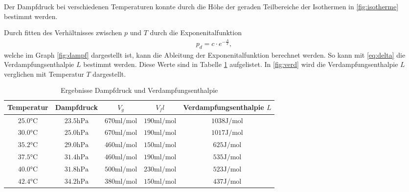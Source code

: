 \documentclass[11pt, a4paper]{article}
\begin{document}
    Der Dampfdruck bei verschiedenen Temperaturen konnte durch die Höhe der geraden Teilbereiche
    der Isothermen in \ref{fig:isotherme} bestimmt werden.
    

    Durch fitten des Verhältnisses zwischen $p$ und $T$ durch die Exponenitalfunktion
    \begin{align}
        p_d = c \cdot e^{-\frac{A}{T}},
    \end{align}
    welche im Graph \ref{fig:dampf} dargestellt ist,
    kann die Ableitung der Exponenitalfunktion berechnet werden. So kann mit \ref{eq:delta}
    die Verdampfungsenthalpie $L$ bestimmt werden. Diese Werte sind in Tabelle \ref{tab:dampfmess}
    aufgelistet. In \ref{fig:verd} wird die Verdampfungsenthalpie $L$ verglichen mit Temperatur $T$ dargestellt.
    \begin{table}
        \begin{adjustwidth}{-.5in}{-.5in}
        \centering
        \begin{tabular}{c c c c c}
            Temperatur & Dampfdruck & $V_g$ & $V_fl$ & Verdampfungsenthalpie $L$ \\ \hline
            $25.0 \si{\celsius}$ & $23.5 \si{\hecto\pascal}$ & $670 \si{\milli\litre\per\mole} $ & $ 190  \si{\milli\litre\per\mole} $ & $ 1038 \si{\joule\per\mole} $ \\
            $30.0 \si{\celsius}$ & $25.0 \si{\hecto\pascal}$ & $670 \si{\milli\litre\per\mole} $ & $ 190  \si{\milli\litre\per\mole} $ & $ 1017 \si{\joule\per\mole} $ \\
            $35.2 \si{\celsius}$ & $29.0 \si{\hecto\pascal}$ & $460 \si{\milli\litre\per\mole} $ & $ 150  \si{\milli\litre\per\mole} $ & $ 625 \si{\joule\per\mole} $ \\
            $37.5 \si{\celsius}$ & $31.4 \si{\hecto\pascal}$ & $460 \si{\milli\litre\per\mole} $ & $ 190  \si{\milli\litre\per\mole} $ & $ 535 \si{\joule\per\mole} $ \\
            $40.0 \si{\celsius}$ & $31.8 \si{\hecto\pascal}$ & $500 \si{\milli\litre\per\mole} $ & $ 230  \si{\milli\litre\per\mole} $ & $ 523 \si{\joule\per\mole} $ \\
            $42.4 \si{\celsius}$ & $34.2 \si{\hecto\pascal}$ & $380 \si{\milli\litre\per\mole} $ & $ 150  \si{\milli\litre\per\mole} $ & $ 437 \si{\joule\per\mole} $
        \end{tabular}
        \caption{Ergebnisse Dampfdruck und Verdampfungsenthalpie}\label{tab:dampfmess}
        \end{adjustwidth}
    \end{table}
\end{document}

